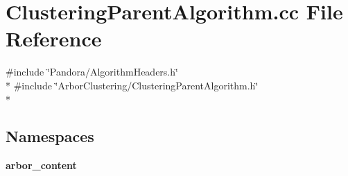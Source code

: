 \section{Clustering\+Parent\+Algorithm.\+cc File Reference}
\label{ClusteringParentAlgorithm_8cc}
{\ttfamily \#include \char`\"{}Pandora/\+Algorithm\+Headers.\+h\char`\"{}}\\*
{\ttfamily \#include \char`\"{}Arbor\+Clustering/\+Clustering\+Parent\+Algorithm.\+h\char`\"{}}\\*
\subsection*{Namespaces}
\begin{DoxyCompactItemize}
\item 
 {\bf arbor\+\_\+content}
\end{DoxyCompactItemize}
